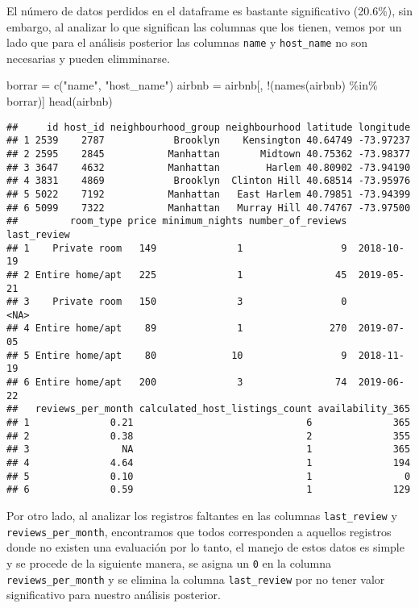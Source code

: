 \documentclass[
]{book}
\newenvironment{Shaded}{\begin{snugshade}}{\end{snugshade}}
\newcommand{\FunctionTok}[1]{\textcolor[rgb]{0.00,0.00,0.00}{#1}}
\newcommand{\NormalTok}[1]{#1}
\newcommand{\OtherTok}[1]{\textcolor[rgb]{0.56,0.35,0.01}{#1}}
\newcommand{\SpecialCharTok}[1]{\textcolor[rgb]{0.00,0.00,0.00}{#1}}
\newcommand{\StringTok}[1]{\textcolor[rgb]{0.31,0.60,0.02}{#1}}
\begin{document}
El número de datos perdidos en el dataframe es bastante significativo (20.6\%), sin embargo, al analizar lo que significan las columnas que los tienen, vemos por un lado que para el análisis posterior las columnas \texttt{name} y \texttt{host\_name} no son necesarias y pueden elimminarse.

\begin{Shaded}
\begin{Highlighting}[]
\NormalTok{borrar }\OtherTok{=} \FunctionTok{c}\NormalTok{(}\StringTok{"name"}\NormalTok{, }\StringTok{"host\_name"}\NormalTok{)}
\NormalTok{airbnb }\OtherTok{=}\NormalTok{ airbnb[, }\SpecialCharTok{!}\NormalTok{(}\FunctionTok{names}\NormalTok{(airbnb) }\SpecialCharTok{\%in\%}\NormalTok{ borrar)]}
\FunctionTok{head}\NormalTok{(airbnb)}
\end{Highlighting}
\end{Shaded}

\begin{verbatim}
##     id host_id neighbourhood_group neighbourhood latitude longitude
## 1 2539    2787            Brooklyn    Kensington 40.64749 -73.97237
## 2 2595    2845           Manhattan       Midtown 40.75362 -73.98377
## 3 3647    4632           Manhattan        Harlem 40.80902 -73.94190
## 4 3831    4869            Brooklyn  Clinton Hill 40.68514 -73.95976
## 5 5022    7192           Manhattan   East Harlem 40.79851 -73.94399
## 6 5099    7322           Manhattan   Murray Hill 40.74767 -73.97500
##         room_type price minimum_nights number_of_reviews last_review
## 1    Private room   149              1                 9  2018-10-19
## 2 Entire home/apt   225              1                45  2019-05-21
## 3    Private room   150              3                 0        <NA>
## 4 Entire home/apt    89              1               270  2019-07-05
## 5 Entire home/apt    80             10                 9  2018-11-19
## 6 Entire home/apt   200              3                74  2019-06-22
##   reviews_per_month calculated_host_listings_count availability_365
## 1              0.21                              6              365
## 2              0.38                              2              355
## 3                NA                              1              365
## 4              4.64                              1              194
## 5              0.10                              1                0
## 6              0.59                              1              129
\end{verbatim}

Por otro lado, al analizar los registros faltantes en las columnas \texttt{last\_review} y \texttt{reviews\_per\_month}, encontramos que todos corresponden a aquellos registros donde no existen una evaluación por lo tanto, el manejo de estos datos es simple y se procede de la siguiente manera, se asigna un \texttt{0} en la columna \texttt{reviews\_per\_month} y se elimina la columna \texttt{last\_review} por no tener valor significativo para nuestro análisis posterior.
\end{document}
